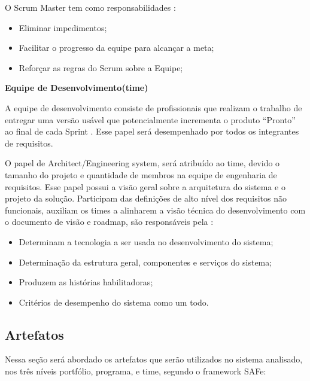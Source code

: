 \begin{description}
O Scrum Master tem como responsabilidades \cite{leffingwell2011}:
\begin{itemize}
    \item Eliminar impedimentos;
    \item Facilitar o progresso da equipe para alcançar a meta;
    \item Reforçar as regras do Scrum sobre a Equipe;
\end{itemize}

\item \textbf{Equipe de Desenvolvimento(time)}

A equipe de desenvolvimento consiste de profissionais que realizam o trabalho de entregar uma versão usável que potencialmente incrementa o produto “Pronto” ao final de cada Sprint \cite{leffingwell2011}. Esse papel será desempenhado por todos os integrantes de requisitos.

O papel de Architect/Engineering system, será atribuído ao time, devido o tamanho do projeto e quantidade de membros na equipe de engenharia de requisitos. Esse papel possui a visão geral sobre a arquitetura do sistema e o projeto da solução. Participam das definições de alto nível dos requisitos não funcionais, auxiliam os times a alinharem a visão técnica do desenvolvimento com o documento de visão e roadmap, são responsáveis pela \cite{safe}:
\begin{itemize}
    \item Determinam a tecnologia a ser usada no desenvolvimento do sistema;
    \item Determinação da estrutura geral, componentes e serviços do sistema;
    \item Produzem as histórias habilitadoras;
    \item Critérios de desempenho do sistema como um todo.
\end{itemize}
\end{description}

\subsection{Artefatos}\label{processoArtefatos}

Nessa seção será abordado os artefatos que serão utilizados no sistema analisado, nos três níveis portfólio, programa, e time, segundo o framework SAFe:


